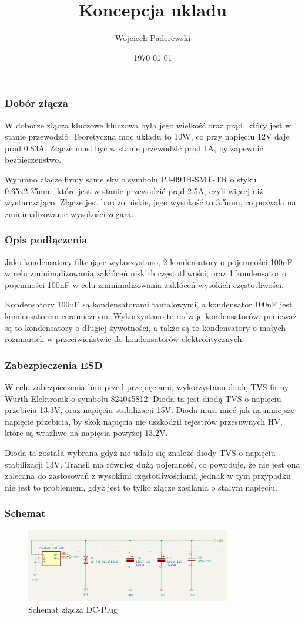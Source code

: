\documentclass[../../main.tex]{subfiles}
\author{Wojciech Paderewski}
\date{\today}
\title{Koncepcja ukladu}
\begin{document}
\subsubsection{Dobór złącza}
W doborze złącza kluczowe kluczowa była jego wielkość oraz prąd, który jest w stanie przewodzić. Teoretyczna moc układu to 10W,
co przy napięciu 12V daje prąd 0.83A. Złącze musi być w stanie przewodzić prąd 1A, by zapewnić bezpieczeństwo. 

Wybrano złącze firmy same sky o symbolu PJ-094H-SMT-TR o styku 0.65x2.35mm, które jest w stanie przewodzić prąd 2.5A, czyli więcej niż wystarczająco.
Złącze jest bardzo niskie, jego wysokość to 3.5mm, co pozwala na zminimalizowanie wysokości zegara.
\subsubsection{Opis podłączenia}
Jako kondensatory filtrujące wykorzystano, 2 kondensatory o 
pojemności 100uF w celu zminimalizowania zakłóceń niskich częstotliwości, oraz 1 kondensator o pojemności 100nF w celu zminimalizowania zakłóceń wysokich częstotliwości.

Kondensatory 100uF są kondensatorami tantalowymi, a kondensator 100nF jest kondensatorem ceramicznym. Wykorzystano te rodzaje kondensatorów, 
ponieważ są to kondensatory o długiej żywotności, a także są to kondensatory o małych rozmiarach w przeciwieństwie do kondensatorów elektrolitycznych.
\subsubsection{Zabezpieczenia ESD}
W celu zabezpieczenia linii przed przepięciami, wykorzystano diodę TVS firmy Wurth Elektronik o symbolu 824045812. Dioda ta jest diodą TVS o napięciu przebicia 13.3V,
oraz napięciu stabilizacji 15V. Dioda musi mieć jak najmniejsze napięcie przebicia, by skok napięcia nie uszkodził rejestrów przesuwnych HV, które są wrażliwe na napięcia powyżej 13.2V.

Dioda ta została wybrana gdyż nie udało się znaleźć diody TVS o napięciu stabilizacji 13V. Transil ma również dużą pojemność, co powoduje, że nie jest ona zalecana do 
zastosowań z wysokimi częstotliwościami, jednak w tym przypadku nie jest to problemem, gdyż jest to tylko złącze zasilania o stałym napięciu.
\subsubsection{Schemat}
\begin{figure}[H]
    \centering
    \includegraphics[width=0.8\textwidth]{DcPlug_schemat.png}
    \caption{Schemat złącza DC-Plug}
\end{figure}
\end{document}
